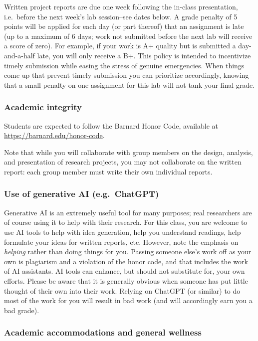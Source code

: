 \documentclass[
  letterpaper,
  DIV=11,
  numbers=noendperiod]{scrartcl}
\begin{document}
Written project reports are due one week following the in-class
presentation, i.e.~before the next week's lab session--see dates below.
A grade penalty of 5 points will be applied for each day (or part
thereof) that an assignment is late (up to a maximum of 6 days; work not
submitted before the next lab will receive a score of zero). For
example, if your work is A+ quality but is submitted a day-and-a-half
late, you will only receive a B+. This policy is intended to incentivize
timely submission while easing the stress of genuine emergencies. When
things come up that prevent timely submission you can prioritize
accordingly, knowing that a small penalty on one assignment for this lab
will not tank your final grade.

\subsubsection{Academic integrity}\label{academic-integrity}

Students are expected to follow the Barnard Honor Code, available at
\url{https://barnard.edu/honor-code}.

Note that while you will collaborate with group members on the design,
analysis, and presentation of research projects, you may not collaborate
on the written report: each group member must write their own individual
reports.

\subsubsection{Use of generative AI
(e.g.~ChatGPT)}\label{use-of-generative-ai-e.g.-chatgpt}

Generative AI is an extremely useful tool for many purposes; real
researchers are of course using it to help with their research. For this
class, you are welcome to use AI tools to help with idea generation,
help you understand readings, help formulate your ideas for written
reports, etc. However, note the emphasis on \emph{helping} rather than
doing things for you. Passing someone else's work off as your own is
plagiarism and a violation of the honor code, and that includes the work
of AI assistants. AI tools can enhance, but should not substitute for,
your own efforts. Please be aware that it is generally obvious when
someone has put little thought of their own into their work. Relying on
ChatGPT (or similar) to do most of the work for you will result in bad
work (and will accordingly earn you a bad grade).

\subsubsection{Academic accommodations and general
wellness}\label{academic-accommodations-and-general-wellness}
\end{document}
